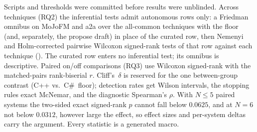 Scripts and thresholds were committed before results were unblinded. Across techniques (RQ2) the
inferential tests admit autonomous rows only: a Friedman omnibus on MoJoFM and a2a over the
all-common techniques with the floor (and, separately, the propose draft) in place of the curated
row, then Nemenyi and Holm-corrected pairwise Wilcoxon signed-rank tests of that row against each
technique (\trStats{}). The curated row enters no inferential test; its omnibus is descriptive. Paired on/off comparisons (RQ3) use Wilcoxon
signed-rank with the matched-pairs rank-biserial $r$. Cliff's~$\delta$ is reserved for the one
between-group contrast (C++ vs.\ C\#\ floor); detection rates get Wilson intervals, the stopping
rules exact McNemar, and the diagnostic Spearman's $\rho$. With $N\le 5$ paired systems the
two-sided exact signed-rank $p$ cannot fall below $0.0625$, and at $N=6$ not below $0.0312$,
however large the effect, so effect sizes and per-system deltas carry the argument. Every statistic is a generated macro.
